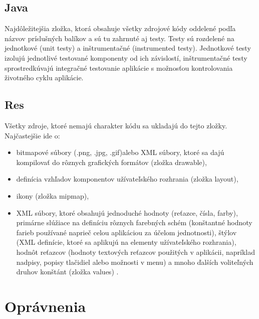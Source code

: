 \subsection*{Java}

Najdôležitejšia zložka, ktorá obsahuje všetky zdrojové kódy oddelené podľa názvov príslušných balíkov a sú tu zahrnuté aj testy. Testy sú rozdelené na jednotkové (unit testy) a inštrumentačné (instrumented testy). Jednotkové testy izolujú jednotlivé testované komponenty od ich závislostí, inštrumentačné testy sprostredkúvajú integračné testovanie aplikácie s možnosťou kontrolovania životného cyklu aplikácie. 

\subsection*{Res}

Všetky zdroje, ktoré nemajú charakter kódu sa ukladajú do tejto zložky. Najčastejšie ide o: 
\begin{itemize}
\item{bitmapové súbory (.png, .jpg, .gif)\protect\footnotemark alebo XML súbory, ktoré sa dajú kompilovať do rôznych grafických formátov (zložka drawable),}
\item{definícia vzhľadov komponentov užívateľského rozhrania (zložka layout),}
\item{ikony (zložka mipmap),}
\item{XML súbory, ktoré obsahujú jednoduché hodnoty (reťazce, čísla, farby), primárne slúžiace na definíciu rôznych farebných schém (konštantné hodnoty farieb používané naprieč celou aplikáciou za účelom jednotnosti), štýlov (XML definície, ktoré sa aplikujú na elementy užívateľského rozhrania), hodnôt reťazcov (hodnoty textových reťazcov použitých v aplikácii, napríklad nadpisy, popisy tlačidiel alebo možnosti v menu) a mnoho ďalších voliteľných druhov konštánt (zložka values) \cite{Jackson}.}
\end{itemize}

\section{Oprávnenia}
\label{permissions}

